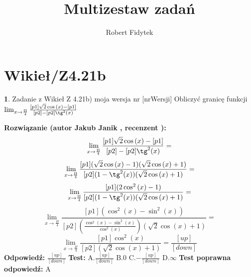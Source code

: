 \documentclass[12pt, a4paper]{article}
\title{Multizestaw zadań}
\author{Robert Fidytek}
\date{}
\theoremstyle{definition} %
\newtheorem{zad}{}
\newcommand{\kategoria}[1]{\section{#1}} %
\newcommand{\zadStart}[1]{\begin{zad}#1\newline} %
\newcommand{\zadStop}{\end{zad}}   %
\newcommand{\rozwStart}[2]{\noindent \textbf{Rozwiązanie (autor #1 , recenzent #2): }\newline} %
\newcommand{\odpStart}{\noindent \textbf{Odpowiedź:}\newline}    %
\newcommand{\odpStop}{\newline}                                             %
\newcommand{\testStart}{\noindent \textbf{Test:}\newline} %
\newcommand{\testStop}{\newline} %
\newcommand{\kluczStart}{\noindent \textbf{Test poprawna odpowiedź:}\newline} %
\newcommand{\kluczStop}{\newline} %
\begin{document}
\maketitle


\kategoria{Wikieł/Z4.21b}
\zadStart{Zadanie z Wikieł Z 4.21b) moja wersja nr [nrWersji]}
Obliczyć granicę funkcji $\lim_{x \to \frac{\Pi}{4}} \frac{[p1]\sqrt{2}\cos{(x)}-[p1]}{[p2]-[p2]\tg^2{(x)}}$
\zadStop
\rozwStart{Jakub Janik}{}
$$\lim_{x \to \frac{\Pi}{4}} \frac{[p1]\sqrt{2}\cos{(x)}-[p1]}{[p2]-[p2]\tg^2{(x)}}=$$
$$\lim_{x \to \frac{\Pi}{4}} \frac{[p1](\sqrt{2}\cos{(x)}-1)(\sqrt{2}\cos{(x)}+1)}{[p2](1-\tg^2{(x)})(\sqrt{2}\cos{(x)}+1)}=$$
$$\lim_{x \to \frac{\Pi}{4}} \frac{[p1](2\cos^2{(x)}-1)}{[p2](1-\tg^2{(x)})(\sqrt{2}\cos{(x)}+1)}=$$
$$\lim_{x \to \frac{\Pi}{4}} \frac{[p1](\cos^2{(x)}-\sin^2{(x)})}{[p2](\frac{\cos^2{(x)}-\sin^2{(x)}}{\cos^2{(x)}})(\sqrt{2}\cos{(x)}+1)}=$$
$$\lim_{x \to \frac{\Pi}{4}} \frac{[p1]\cos^2{(x)}}{[p2](\sqrt{2}\cos{(x)}+1)}=\frac{[up]}{[down]}$$
\odpStart
$\frac{[up]}{[down]}$
\odpStop
\testStart
A.$\frac{[up]}{[down]}$
B.$0$
C.$-\frac{[up]}{[down]}$
D.$\infty$
\testStop
\kluczStart
A
\kluczStop
\end{document}
